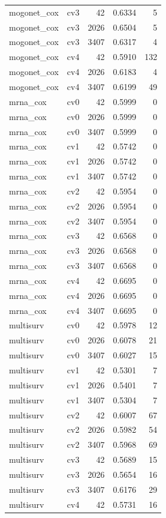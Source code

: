 \documentclass[10pt]{article}
\begin{document}
\begin{longtable}{llrrr}
mogonet\_cox & cv3 & 42 & 0.6334 & 5\\
mogonet\_cox & cv3 & 2026 & 0.6504 & 5\\
mogonet\_cox & cv3 & 3407 & 0.6317 & 4\\
mogonet\_cox & cv4 & 42 & 0.5910 & 132\\
mogonet\_cox & cv4 & 2026 & 0.6183 & 4\\
mogonet\_cox & cv4 & 3407 & 0.6199 & 49\\
mrna\_cox & cv0 & 42 & 0.5999 & 0\\
mrna\_cox & cv0 & 2026 & 0.5999 & 0\\
mrna\_cox & cv0 & 3407 & 0.5999 & 0\\
mrna\_cox & cv1 & 42 & 0.5742 & 0\\
mrna\_cox & cv1 & 2026 & 0.5742 & 0\\
mrna\_cox & cv1 & 3407 & 0.5742 & 0\\
mrna\_cox & cv2 & 42 & 0.5954 & 0\\
mrna\_cox & cv2 & 2026 & 0.5954 & 0\\
mrna\_cox & cv2 & 3407 & 0.5954 & 0\\
mrna\_cox & cv3 & 42 & 0.6568 & 0\\
mrna\_cox & cv3 & 2026 & 0.6568 & 0\\
mrna\_cox & cv3 & 3407 & 0.6568 & 0\\
mrna\_cox & cv4 & 42 & 0.6695 & 0\\
mrna\_cox & cv4 & 2026 & 0.6695 & 0\\
mrna\_cox & cv4 & 3407 & 0.6695 & 0\\
multisurv & cv0 & 42 & 0.5978 & 12\\
multisurv & cv0 & 2026 & 0.6078 & 21\\
multisurv & cv0 & 3407 & 0.6027 & 15\\
multisurv & cv1 & 42 & 0.5301 & 7\\
multisurv & cv1 & 2026 & 0.5401 & 7\\
multisurv & cv1 & 3407 & 0.5304 & 7\\
multisurv & cv2 & 42 & 0.6007 & 67\\
multisurv & cv2 & 2026 & 0.5982 & 54\\
multisurv & cv2 & 3407 & 0.5968 & 69\\
multisurv & cv3 & 42 & 0.5689 & 15\\
multisurv & cv3 & 2026 & 0.5654 & 16\\
multisurv & cv3 & 3407 & 0.6176 & 29\\
multisurv & cv4 & 42 & 0.5731 & 16\\

\end{longtable}
\end{document}
